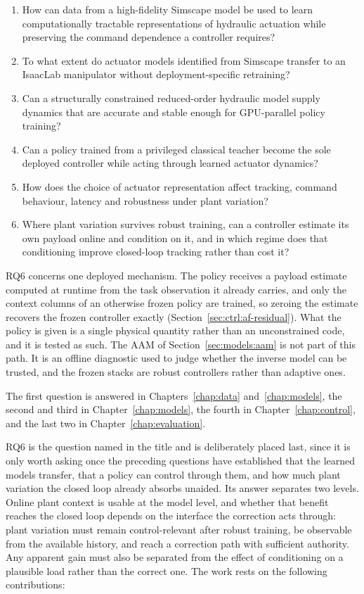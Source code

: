 \begin{enumerate}
  \item How can data from a high-fidelity Simscape model be used to learn
    computationally tractable representations of hydraulic actuation while
    preserving the command dependence a controller requires?
  \item To what extent do actuator models identified from Simscape transfer to
    an IsaacLab manipulator without deployment-specific retraining?
  \item Can a structurally constrained reduced-order hydraulic model supply
    dynamics that are accurate and stable enough for GPU-parallel policy
    training?
  \item Can a policy trained from a privileged classical teacher become the sole
    deployed controller while acting through learned actuator dynamics?
  \item How does the choice of actuator representation affect tracking, command
    behaviour, latency and robustness under plant variation?
  \item Where plant variation survives robust training, can a controller
    estimate its own payload online and condition on it, and in which regime
    does that conditioning improve closed-loop tracking rather than cost it?
\end{enumerate}

RQ6 concerns one deployed mechanism. The policy receives a payload estimate
computed at runtime from the task observation it already carries, and only the
context columns of an otherwise frozen policy are trained, so zeroing the
estimate recovers the frozen controller exactly
(Section~\ref{sec:ctrl:af-residual}). What the policy is given is a single
physical quantity rather than an unconstrained code, and it is tested as such.
The AAM of Section~\ref{sec:models:aam} is not part of this path. It is an
offline diagnostic used to judge whether the inverse model can be trusted, and
the frozen stacks are robust controllers rather than adaptive ones.

The first question is answered in Chapters~\ref{chap:data}
and~\ref{chap:models}, the second and third in Chapter~\ref{chap:models}, the
fourth in Chapter~\ref{chap:control}, and the last two in
Chapter~\ref{chap:evaluation}.

RQ6 is the question named in the title and is deliberately placed last, since it
is only worth asking once the preceding questions have established that the
learned models transfer, that a policy can control through them, and how much
plant variation the closed loop already absorbs unaided. Its answer separates
two levels. Online plant context is usable at the model level, and whether that
benefit reaches the closed loop depends on the interface the correction acts
through: plant variation must remain control-relevant after robust training, be
observable from the available history, and reach a correction path with
sufficient authority. Any apparent gain must also be separated from the effect
of conditioning on a plausible load rather than the correct one. The work rests on the following contributions:

